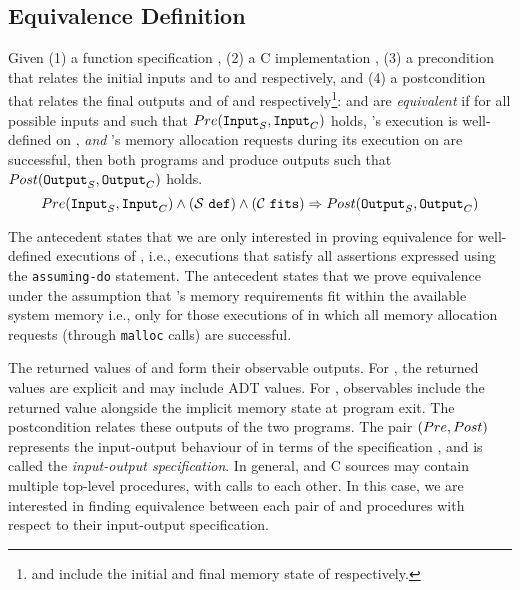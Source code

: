 \subsection{Equivalence Definition}
\label{sec:eqdef}
Given (1) a \SpecL{} function specification \sprog{}, (2) a C implementation \cprog{},
(3) a precondition \pre{} that relates the initial inputs  and  to
\sprog{} and \cprog{} respectively, and (4) a postcondition \post{} that relates the final outputs
 and  of \sprog{} and \cprog{} respectively\footnote{ and 
include the initial and final memory state of \cprog{} respectively.}:
\sprog{} and \cprog{} are {\em equivalent} if for all possible inputs  and  such that
${Pre}{}({\tt Input}_{S},{\tt Input}_{C})$ holds,
\sprog{}'s execution is well-defined on , {\em and}
\cprog{}'s memory allocation requests during its execution on  are successful,
then both programs \sprog{} and \cprog{} produce outputs such that ${Post}{}({\tt Output}_{S},{\tt Output}_{C})$ holds.
$$
{Pre}{}({\tt Input}_{S},{\tt Input}_{C}) \land {({\ensuremath{\mathcal{S}}}{}\ {\tt def})}{} \land {({\ensuremath{\mathcal{C}}}{}\ {\tt fits})}{} \Rightarrow {\ensuremath{Post}}{}({\tt Output}_{S},{\tt Output}_{C})
$$

The \sdef{} antecedent states that we are only interested in proving equivalence for
well-defined executions of \sprog{}, i.e., executions that satisfy all assertions expressed
using the {\tt assuming-do} statement.
The \cfits{} antecedent states that we prove equivalence under the assumption that \cprog{}'s memory
requirements fit within the available system memory i.e., only for those executions of \cprog{}
in which all memory allocation requests (through {\tt malloc} calls) are successful.

The returned values of \sprog{} and \cprog{} form their observable outputs.
For \sprog{}, the returned values are explicit and may include ADT values.
For \cprog{}, observables include the returned value alongside the implicit memory state
at program exit.
The postcondition \post{} relates these outputs of the two programs.
The pair $({Pre}{},{Post}{})$ represents the input-output behaviour of \cprog{} in terms of the specification \sprog{},
and is called the {\em input-output specification}.
In general, \SpecL{} and C sources may contain multiple top-level procedures, with calls to each other.
In this case, we are interested in finding equivalence between each pair
of \sprog{} and \cprog{} procedures with respect to their input-output specification.

